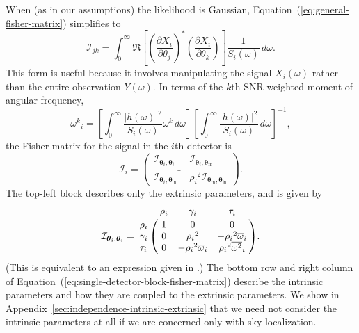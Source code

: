 \documentclass[amsmath,amssymb,aps,prx,reprint,nopreprintnumbers,nofootinbib]{revtex4-1}
\newcommand\transpose{\ensuremath{^{^\mathsf{T}}}}
\begin{document}
When (as in our assumptions) the likelihood is Gaussian, Equation~(\ref{eq:general-fisher-matrix}) simplifies to
%
\begin{equation}\label{eq:gaussian-fisher-matrix}
    \mathcal{I}_{jk} = \int_0^\infty \Re \left[
        \left(\frac{\partial X_i}{\partial \theta_j}\right)^*
        \left(\frac{\partial X_i}{\partial \theta_k}\right)
    \right] \frac{1}{S_i(\omega)} \, d\omega.
\end{equation}
%
This form is useful because it involves manipulating the signal $X_i (\omega)$ rather than the entire observation $Y (\omega)$. In terms of the $k$th \ac{SNR}-weighted moment of angular frequency,
%
\begin{equation}\label{eq:angular-frequency-moments}
    {\overline{\omega^k}}_i =
        \left[ \int_0^\infty \frac{|h (\omega)|^2}{S_i(\omega)} \omega^k \, d\omega \right]
        \left[ \int_0^\infty \frac{|h (\omega)|^2}{S_i(\omega)} \, d\omega \right]^{-1},
\end{equation}
%
the Fisher matrix for the signal in the $i$th detector is
%
\begin{equation}
    \label{eq:single-detector-block-fisher-matrix}
    \mathcal{I}_i = \left(
        \begin{array}{cc}
            \mathcal{I}_{\bm\theta_i,\bm\theta_i} &
            \mathcal{I}_{\bm\theta_i,\bm\theta_\mathrm{in}} \\
            {\mathcal{I}_{\bm\theta_i,\bm\theta_\mathrm{in}}}\transpose &
            {\rho_i}^2 \mathcal{I}_{\bm\theta_\mathrm{in},\bm\theta_\mathrm{in}}
        \end{array}
    \right).
\end{equation}
%
The top-left block describes only the extrinsic parameters, and is given by
%
\begin{equation}\label{eq:fisher-matrix}
    \mathcal{I}_{\bm\theta_i,\bm\theta_i} = \bordermatrix{
        ~ & \rho_i & \gamma_i & \tau_i \cr
        \rho_i & 1 & 0 & 0 \cr
        \gamma_i & 0 & {\rho_i}^2 & -{\rho_i}^2 {\overline{\omega}}_i \cr
        \tau_i & 0 & -{\rho_i}^2 {\overline{\omega}}_i & {\rho_i}^2 {\overline{\omega^2}}_i
    }.
\end{equation}
%
(This is equivalent to an expression given in \cite{Grover:2013}.) The bottom row and right column of Equation~(\ref{eq:single-detector-block-fisher-matrix}) describe the intrinsic parameters and how they are coupled to the extrinsic parameters. We show in Appendix~\ref{sec:independence-intrinsic-extrinsic} that we need not consider the intrinsic parameters at all if we are concerned only with sky localization.
\end{document}

